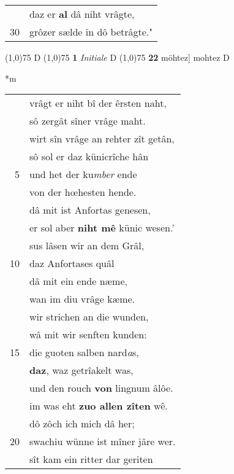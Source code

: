 \documentclass[8pt,a4paper,notitlepage]{article}
\begin{document}
\begin{table}[ht]
\begin{minipage}[t]{0.5\linewidth}
\begin{tabular}{rl}
 & daz er \textbf{al} dâ niht vrâgte,\\ 
30 & grôzer sælde in dô betrâgte."\\ 
\end{tabular}
\scriptsize
\line(1,0){75} \newline
D \newline
\line(1,0){75} \newline
\textbf{1} \textit{Initiale} D  \newline
\line(1,0){75} \newline
\textbf{22} möhtez] mohtez D \newline
\end{minipage}
\hspace{0.5cm}
\begin{minipage}[t]{0.5\linewidth}
\small
\begin{center}*m
\end{center}
\begin{tabular}{rl}
 & vrâgt er niht bî der êrsten naht,\\ 
 & sô zergât sîner vrâge maht.\\ 
 & wirt sîn vrâge an rehter zît getân,\\ 
 & sô sol er daz künicrîche hân\\ 
5 & und het der ku\textit{mber} ende\\ 
 & von der hœhesten hende.\\ 
 & dâ mit ist Anfortas genesen,\\ 
 & er sol aber \textbf{niht mê} künic wesen.'\\ 
 & sus lâsen wir an dem Grâl,\\ 
10 & daz Anfortases quâl\\ 
 & dâ mit ein ende næme,\\ 
 & wan im diu vrâge kæme.\\ 
 & wir strichen an die wunden,\\ 
 & wâ mit wir senften kunden:\\ 
15 & die guoten salben nard\textit{a}s,\\ 
 & \textbf{daz}, waz getrîakelt was,\\ 
 & und den rouch \textbf{von} lingnum âlôe.\\ 
 & im was eht \textbf{zuo allen zîten} wê.\\ 
 & dô zôch ich mich dâ her;\\ 
20 & swachiu wünne ist mîner jâre wer.\\ 
 & sît kam ein ritter dar geriten\\ 

\end{tabular}
\end{minipage}
\end{table}
\end{document}
